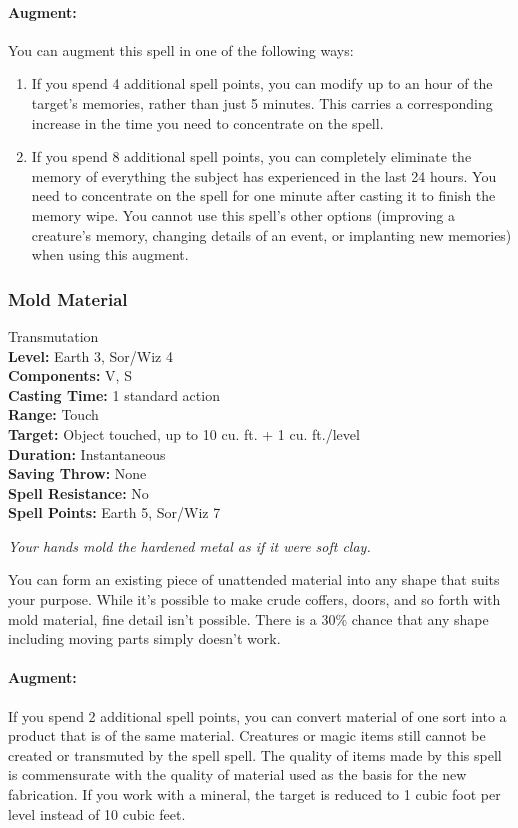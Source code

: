 \paragraph{Augment:} You can augment this spell in one of the following ways:
\begin{enumerate}
 \item If you spend 4 additional spell points, you can modify up to an hour of the target's memories, rather than just 5 minutes.
 This carries a corresponding increase in the time you need to concentrate on the spell.
 \item If you spend 8 additional spell points, you can completely eliminate the memory of everything the subject has experienced in the last 24 hours. You need to concentrate on the spell for one minute after casting it to finish the memory wipe. You cannot use this spell's other options (improving a creature's memory, changing details of an event, or implanting new memories) when using this augment.
\end{enumerate}

\subsubsection{Mold Material}
\label{Spell:MoldMaterial}
Transmutation
\\ \textbf{Level:} Earth 3, Sor/Wiz 4
\\ \textbf{Components:} V, S
\\ \textbf{Casting Time:} 1 standard action
\\ \textbf{Range:} Touch
\\ \textbf{Target:} Object touched, up to 10 cu. ft. + 1 cu. ft./level
\\ \textbf{Duration:} Instantaneous
\\ \textbf{Saving Throw:} None
\\ \textbf{Spell Resistance:} No
\\ \textbf{Spell Points:} Earth 5, Sor/Wiz 7

\emph{Your hands mold the hardened metal as if it were soft clay.}

You can form an existing piece of unattended material into any shape that suits your purpose. 
While it's possible to make crude coffers, doors, and so forth with mold material, fine detail isn't possible. 
There is a 30\% chance that any shape including moving parts simply doesn't work.

\paragraph{Augment:} If you spend 2 additional spell points, you can
convert material of one sort into a product that is of the same material.
Creatures or magic items still cannot be created or transmuted by the spell spell. 
The quality of items made by this spell is commensurate with the quality of material used as the basis for the new fabrication. 
If you work with a mineral, the target is reduced to 1 cubic foot per level instead of 10 cubic feet.


